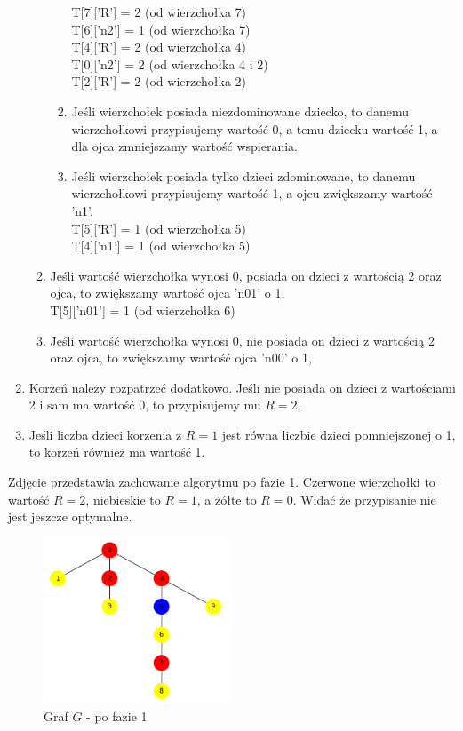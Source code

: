 \begin{enumerate}
\begin{enumerate}
\begin{enumerate}
                T[7]['R'] = 2  (od wierzchołka 7)\\
                T[6]['n2'] = 1  (od wierzchołka 7)\\
                T[4]['R'] = 2  (od wierzchołka 4)\\
                T[0]['n2'] = 2  (od wierzchołka 4 i 2)\\
                T[2]['R'] = 2  (od wierzchołka 2)\\
                \item Jeśli wierzchołek posiada niezdominowane dziecko, to danemu wierzchołkowi przypisujemy wartość 0, a temu dziecku wartość 1, a dla ojca zmniejszamy wartość wspierania.
                \item Jeśli wierzchołek posiada tylko dzieci zdominowane, to danemu wierzchołkowi przypisujemy wartość 1, a ojcu zwiększamy wartość 'n1'.\\
                T[5]['R'] = 1  (od wierzchołka 5)\\
                T[4]['n1'] = 1  (od wierzchołka 5)\\
            \end{enumerate}
        \item Jeśli wartość wierzchołka wynosi 0, posiada on dzieci z wartością 2 oraz ojca, to zwiększamy wartość ojca 'n01' o 1,\\
        T[5]['n01'] = 1  (od wierzchołka 6)\\
        \item Jeśli wartość wierzchołka wynosi 0, nie posiada on dzieci z wartością 2 oraz ojca, to zwiększamy wartość ojca 'n00' o 1,\\
    \end{enumerate}
    \item Korzeń należy rozpatrzeć dodatkowo. Jeśli nie posiada on dzieci z wartościami 2 i sam ma wartość 0, to przypisujemy mu $R=2$,
    \item Jeśli liczba dzieci korzenia z $R=1$ jest równa liczbie dzieci pomniejszonej o 1, to korzeń również ma wartość 1.
\end{enumerate}

Zdjęcie przedstawia zachowanie algorytmu po fazie 1. Czerwone wierzchołki to wartość $R=2$, niebieskie to $R=1$, a żółte to $R=0$. Widać że przypisanie nie jest jeszcze optymalne.

\begin{figure}[H]
    \centering
    \includegraphics[width=0.5\textwidth]{assets/phase1.png}
    \caption{Graf $G$ - po fazie 1}
    \label{fig:drzewoFaza1}
\end{figure}


